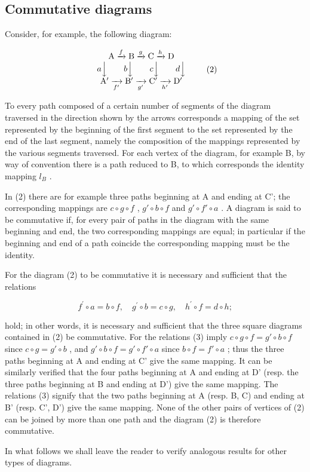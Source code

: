 \subsection{Commutative diagrams}

Consider, for example, the following diagram:

\[
\begin{array}{c} \mathrm{A} \xrightarrow {f} \mathrm{B} \xrightarrow {g} \mathrm{C} \xrightarrow {h} \mathrm{D} \\ a \Big \downarrow \qquad b \Big \downarrow \qquad c \Big \downarrow \qquad d \Big \downarrow \\ \mathrm{A} ^ {\prime} \xrightarrow [ f ^ {\prime} ]{} \mathrm{B} ^ {\prime} \xrightarrow [ g ^ {\prime} ]{} \mathrm{C} ^ {\prime} \xrightarrow [ h ^ {\prime} ]{} \mathrm{D} ^ {\prime} \end{array}\tag{2}
\]

To every path composed of a certain number of segments of the diagram traversed in the direction shown by the arrows corresponds a mapping of the set represented by the beginning of the first segment to the set represented by the end of the last segment, namely the composition of the mappings represented by the various segments traversed. For each vertex of the diagram, for example B, by way of convention there is a path reduced to B, to which corresponds the identity mapping \(l_{B}\) .

In (2) there are for example three paths beginning at A and ending at C'; the corresponding mappings are \(c \circ g \circ f\) , \(g' \circ b \circ f\) and \(g' \circ f' \circ a\) . A diagram is said to be commutative if, for every pair of paths in the diagram with the same beginning and end, the two corresponding mappings are equal; in particular if the beginning and end of a path coincide the corresponding mapping must be the identity.

For the diagram (2) to be commutative it is necessary and sufficient that the relations

\[
f ^ {\prime} \circ a = b \circ f, \quad g ^ {\prime} \circ b = c \circ g, \quad h ^ {\prime} \circ f = d \circ h;\tag{3}
\]

hold; in other words, it is necessary and sufficient that the three square diagrams contained in (2) be commutative. For the relations (3) imply \(c \circ g \circ f = g' \circ b \circ f\) since \(c \circ g = g' \circ b\) , and \(g' \circ b \circ f = g' \circ f' \circ a\) since \(b \circ f = f' \circ a\) ; thus the three paths beginning at A and ending at C' give the same mapping. It can be similarly verified that the four paths beginning at A and ending at D' (resp. the three paths beginning at B and ending at D') give the same mapping. The relations (3) signify that the two paths beginning at A (resp. B, C) and ending at B' (resp. C', D') give the same mapping. None of the other pairs of vertices of (2) can be joined by more than one path and the diagram (2) is therefore commutative.

In what follows we shall leave the reader to verify analogous results for other types of diagrams.

